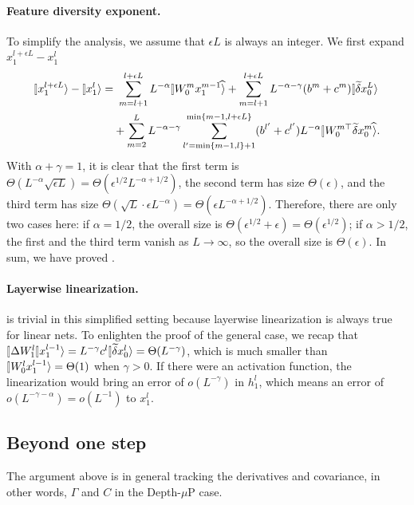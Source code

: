 \documentclass{article}
\theoremstyle{plain}
\theoremstyle{definition}
\begin{document}
\paragraph{Feature diversity exponent.} To simplify the analysis, we assume that $\epsilon L$ is always an integer. We first expand $x_1^{l+\epsilon L}-x_1^l$ 
\begin{align}
    \ket{x_1^{l+\epsilon L}} - \ket{x_1^{l}}=&~ \sum_{m=l+1}^{l+\epsilon L} L^{-\alpha} \hatket{W_0^m x_1^{m-1}} + \sum_{m=l+1}^{l+\epsilon L} L^{-\alpha-\gamma} (b^m +c^m)\ket{\tilde \del x_0^L} \nonumber\\
    & + \sum_{m=2}^L L^{-\alpha-\gamma} \sum_{l'=\min\{m-1,l\}+1}^{\min\{m-1,l+\epsilon L\}} (b^{l'}+c^{l'}) L^{-\alpha} \hatket{W_0^{m\top}\tilde \del x_0^m}. \nonumber
\end{align}
With $\alpha+\gamma=1$, it is clear that the first term is $\Theta(L^{-\alpha} \sqrt{\epsilon L})=\Theta(\epsilon^{1/2}L^{-\alpha+1/2})$, 
the second term has size $\Theta(\epsilon)$, 
and the third term has size $\Theta(\sqrt L\cdot \epsilon L^{-\alpha})=\Theta(\epsilon L^{-\alpha+1/2})$. Therefore, there are only two cases here: if $\alpha = 1/2$, the overall size is $\Theta(\epsilon^{1/2}+\epsilon)=\Theta(\epsilon^{1/2})$; if $\alpha > 1/2$, the first and the third term vanish as $L\to\infty$, so the overall size is $\Theta(\epsilon)$. In sum, we have proved .

\paragraph{Layerwise linearization.}  is trivial in this simplified setting because layerwise linearization is always true for linear nets. To enlighten the proof of the general case, we recap that $\oplim{\Delta W_1^l} x_1^{l-1} \ra = L^{-\gamma} c^l \ket{\tilde \del x_0^l}=\Theta(L^{-\gamma})$, which is much smaller than $\ket{W_0^l x_1^{l-1}}=\Theta(1)$ when $\gamma > 0$. If there were an activation function, the linearization would bring an error of $o(L^{-\gamma})$ in $h_1^l$, which means an error of $o(L^{-\gamma-\alpha})=o(L^{-1})$ to $x_1^l$.

\subsection{Beyond one step}
The argument above is in general tracking the derivatives and covariance, in other words, $\Gamma$ and $C$ in the Depth-$\mu$P case. 
\end{document}
